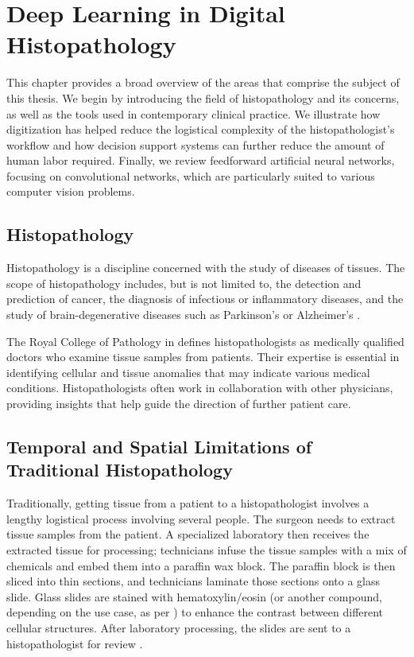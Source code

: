 \chapter{Deep Learning in Digital Histopathology}

This chapter provides a broad overview of the areas that comprise the subject of this thesis.
We begin by introducing the field of histopathology and its concerns, as well as the tools used in contemporary clinical practice.
We illustrate how digitization has helped reduce the logistical complexity of the histopathologist's workflow and how decision support systems can further reduce the amount of human labor required.
Finally, we review feedforward artificial neural networks, focusing on convolutional networks, which are particularly suited to various computer vision problems.

\section{Histopathology}

Histopathology is a discipline concerned with the study of diseases of tissues.
The scope of histopathology includes, but is not limited to, the detection and prediction of cancer, the diagnosis of infectious or inflammatory diseases, and the study of brain-degenerative diseases such as Parkinson's or Alzheimer's \cite{histopathology-cancer, histopathology-infectious, histopathology-inflammatory, histopathology-brain-degenerative}.

The Royal College of Pathology in \cite{histopathologist-role} defines histopathologists as medically qualified doctors who examine tissue samples from patients.
Their expertise is essential in identifying cellular and tissue anomalies that may indicate various medical conditions.
Histopathologists often work in collaboration with other physicians, providing insights that help guide the direction of further patient care.

\section{Temporal and Spatial Limitations of Traditional Histopathology}

Traditionally, getting tissue from a patient to a histopathologist involves a lengthy logistical process involving several people.
The surgeon needs to extract tissue samples from the patient.
A specialized laboratory then receives the extracted tissue for processing; technicians infuse the tissue samples with a mix of chemicals and embed them into a paraffin wax block.
The paraffin block is then sliced into thin sections, and technicians laminate those sections onto a glass slide.
Glass slides are stained with hematoxylin/eosin (or another compound, depending on the use case, as per \cite{histopathology-staining}) to enhance the contrast between different cellular structures.
After laboratory processing, the slides are sent to a histopathologist for review \cite{histo-process}.

